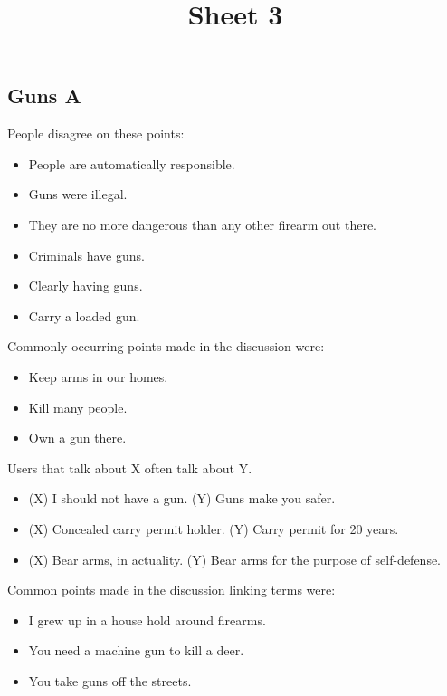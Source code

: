 \documentclass[tikz]{article}
\title{\textbf{Sheet 3}\vspace{-9ex}}
\date{}
\begin{document}
  \maketitle

  \begin{multicols}{2}
    \subsection*{Guns A}
    People disagree on these points:
    \begin{itemize}[noitemsep,nolistsep,label={}]
		\item{People are automatically responsible.}
		\item{Guns were illegal.}
		\item{They are no more dangerous than any other firearm out there.}
		\item{Criminals have guns.}
		\item{Clearly having guns.}
		\item{Carry a loaded gun.}
    \end{itemize}

    Commonly occurring points made in the discussion were:
    \begin{itemize}[noitemsep,nolistsep,label={}]
		\item{Keep arms in our homes.}
		\item{Kill many people.}
		\item{Own a gun there.}
    \end{itemize}

    Users that talk about X often talk about Y.
    \begin{itemize}[noitemsep,nolistsep,label={}]
		\item{(X) I should not have a gun. (Y) Guns make you safer.}
		\item{(X) Concealed carry permit holder. (Y) Carry permit for 20 years.}
		\item{(X) Bear arms, in actuality. (Y) Bear arms for the purpose of self-defense.}
    \end{itemize}

    Common points made in the discussion linking terms were:
    \begin{itemize}[noitemsep,nolistsep,label={}]
		\item{I grew up in a house hold around firearms.}
		\item{You need a machine gun to kill a deer.}
		\item{You take guns off the streets.}
    \end{itemize}


\end{multicols}
\end{document}
